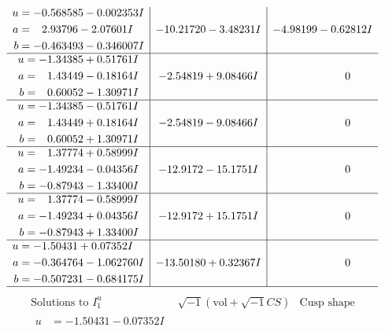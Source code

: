 \documentclass[1p]{elsarticle_modified}
\theoremstyle{definition}
\newcommand{\I}{\sqrt{-1}}
\begin{document}
$$\begin{array}{c|c|c}
\begin{aligned}
u &= -0.568585 - 0.002353 I \\
a &= \phantom{-}2.93796 - 2.07601 I \\
b &= -0.463493 - 0.346007 I\end{aligned}
 & -10.21720 - 3.48231 I & -4.98199 - 0.62812 I \\ \hline\begin{aligned}
u &= -1.34385 + 0.51761 I \\
a &= \phantom{-}1.43449 - 0.18164 I \\
b &= \phantom{-}0.60052 - 1.30971 I\end{aligned}
 & -2.54819 + 9.08466 I & \phantom{-0.000000 } 0 \\ \hline\begin{aligned}
u &= -1.34385 - 0.51761 I \\
a &= \phantom{-}1.43449 + 0.18164 I \\
b &= \phantom{-}0.60052 + 1.30971 I\end{aligned}
 & -2.54819 - 9.08466 I & \phantom{-0.000000 } 0 \\ \hline\begin{aligned}
u &= \phantom{-}1.37774 + 0.58999 I \\
a &= -1.49234 - 0.04356 I \\
b &= -0.87943 - 1.33400 I\end{aligned}
 & -12.9172 - 15.1751 I & \phantom{-0.000000 } 0 \\ \hline\begin{aligned}
u &= \phantom{-}1.37774 - 0.58999 I \\
a &= -1.49234 + 0.04356 I \\
b &= -0.87943 + 1.33400 I\end{aligned}
 & -12.9172 + 15.1751 I & \phantom{-0.000000 } 0 \\ \hline\begin{aligned}
u &= -1.50431 + 0.07352 I \\
a &= -0.364764 - 1.062760 I \\
b &= -0.507231 - 0.684175 I\end{aligned}
 & -13.50180 + 0.32367 I & \phantom{-0.000000 } 0\\
 \hline 
 \end{array}$$\newpage$$\begin{array}{c|c|c}  
\text{Solutions to }I^u_{1}& \I (\text{vol} + \sqrt{-1}CS) & \text{Cusp shape}\\
 \hline 
\begin{aligned}
u &= -1.50431 - 0.07352 I \\

\end{aligned}
\end{array}$$
\end{document}
